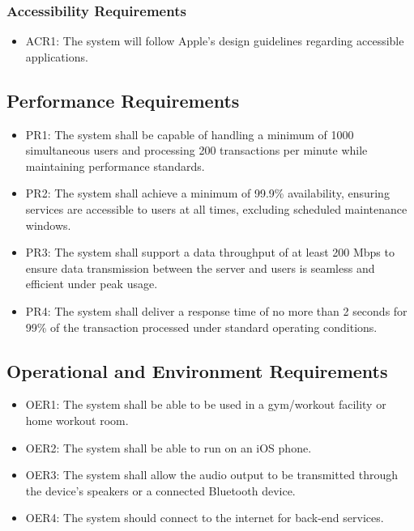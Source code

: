 \documentclass[12pt]{article}
\begin{document}
\subsubsection{Accessibility Requirements}
\begin{itemize}
\item ACR1: The system will follow Apple’s design guidelines regarding accessible applications.
\end{itemize}

\subsection{Performance Requirements}
\begin{itemize}
\item PR1: The system shall be capable of handling a minimum of 1000 simultaneous users and processing 200 transactions per minute while maintaining performance standards.
\item PR2: The system shall achieve a minimum of 99.9\% availability, ensuring services are accessible to users at all times, excluding scheduled maintenance windows.
\item PR3: The system shall support a data throughput of at least 200 Mbps to ensure data transmission between the server and users is seamless and efficient under peak usage.
\item PR4: The system shall deliver a response time of no more than 2 seconds for 99\% of the transaction processed under standard operating conditions.
\end{itemize}

\subsection{Operational and Environment Requirements}
\begin{itemize}
\item OER1: The system shall be able to be used in a gym/workout facility or home workout room.
\item OER2: The system shall be able to run on an iOS phone.
\item OER3: The system shall allow the audio output to be transmitted through the device’s speakers or a connected Bluetooth device.
\item OER4: The system should connect to the internet for back-end services.
\end{itemize}
\end{document}
